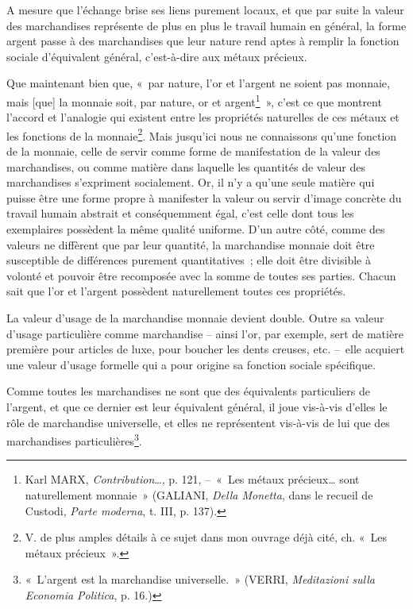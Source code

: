 \documentclass[french,twoside]{book} %
\begin{document}
A mesure que l’échange brise ses liens purement locaux, et que par suite la valeur des marchandises représente de plus en plus le travail humain en général, la forme argent passe à des marchandises que leur nature rend aptes à remplir la fonction sociale d’équivalent général, c’est-à-dire aux métaux précieux.\par
Que maintenant bien que, « par nature, l’or et l’argent ne soient pas monnaie, mais [que] la monnaie soit, par nature, or et argent\footnote{Karl MARX, \emph{Contribution}…, p. 121, – « Les métaux précieux… sont naturellement monnaie » (GALIANI, \emph{Della Monetta}, dans le recueil de Custodi, \emph{Parte moderna}, t. III, p. 137).} », c’est ce que montrent l’accord et l’analogie qui existent entre les propriétés naturelles de ces métaux et les fonctions de la monnaie\footnote{V. de plus amples détails à ce sujet dans mon ouvrage déjà cité, ch. « Les métaux précieux ».}. Mais jusqu’ici nous ne connaissons qu’une fonction de la monnaie, celle de servir comme forme de manifestation de la valeur des marchandises, ou comme matière dans laquelle les quantités de valeur des marchandises s’expriment socialement. Or, il n’y a qu’une seule matière qui puisse être une forme propre à manifester la valeur ou servir d’image concrète du travail humain abstrait et conséquemment égal, c’est celle dont tous les exemplaires possèdent la même qualité uniforme. D’un autre côté, comme des valeurs ne diffèrent que par leur quantité, la marchandise monnaie doit être susceptible de différences purement quantitatives ; elle doit être divisible à volonté et pouvoir être recomposée avec la somme de toutes ses parties. Chacun sait que l’or et l’argent possèdent naturellement toutes ces propriétés.\par
La valeur d’usage de la marchandise monnaie devient double. Outre sa valeur d’usage particulière comme marchandise – ainsi l’or, par exemple, sert de matière première pour articles de luxe, pour boucher les dents creuses, etc. – elle acquiert une valeur d’usage formelle qui a pour origine sa fonction sociale spécifique.\par
Comme toutes les marchandises ne sont que des équivalents particuliers de l’argent, et que ce dernier est leur équivalent général, il joue vis-à-vis d’elles le rôle de marchandise universelle, et elles ne représentent vis-à-vis de lui que des marchandises particulières\footnote{« L’argent est la marchandise universelle. » (VERRI, \emph{Meditazioni sulla Economia Politica}, p. 16.)}.\par
\end{document}
